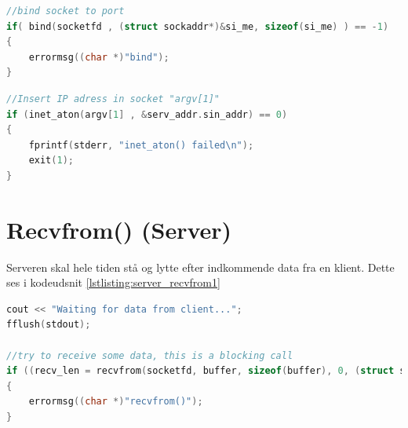 \documentclass[12pt,fleqn,a4paper]{report}
\begin{document}
\begin{framed}
	\begin{lstlisting}[language=C++]
//bind socket to port
if( bind(socketfd , (struct sockaddr*)&si_me, sizeof(si_me) ) == -1)
{
	errormsg((char *)"bind");
}
	\end{lstlisting}
\end{framed}
\label{lstlisting:server_port}
\vspace{5mm} %


\begin{framed}
	\begin{lstlisting}[language=C++]
//Insert IP adress in socket "argv[1]"
if (inet_aton(argv[1] , &serv_addr.sin_addr) == 0)
{
	fprintf(stderr, "inet_aton() failed\n");
	exit(1);
}	
	\end{lstlisting}
\end{framed}
\label{lstlisting:klient_ipadr}
\vspace{5mm} %


\section{Recvfrom() (Server)}
Serveren skal hele tiden stå og lytte efter indkommende data fra en klient. Dette ses i kodeudsnit \ref{lstlisting:server_recvfrom1}
\begin{framed}
	\begin{lstlisting}[language=C++]
cout << "Waiting for data from client...";
fflush(stdout);

//try to receive some data, this is a blocking call
if ((recv_len = recvfrom(socketfd, buffer, sizeof(buffer), 0, (struct sockaddr *) &serv_addr, (socklen_t*)&slen)) == -1)
{
	errormsg((char *)"recvfrom()");
}	
	\end{lstlisting}
\end{framed}
\label{lstlisting:server_recvfrom1}
\vspace{5mm} %
\end{document}
